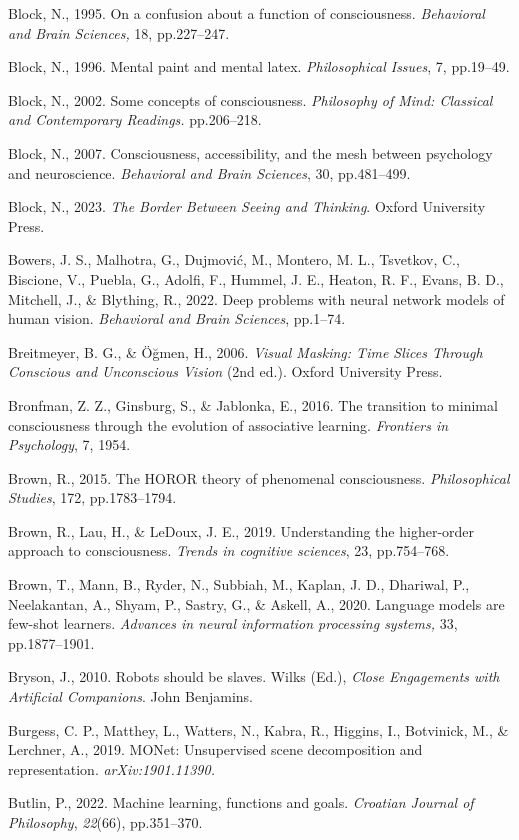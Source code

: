 \documentclass[12pt]{article}
\begin{document}
Block, N., 1995. On a confusion about a function of consciousness.
\emph{Behavioral and Brain Sciences,} 18, pp.227--247.

Block, N., 1996. Mental paint and mental latex. \emph{Philosophical
Issues}, 7, pp.19--49.

Block, N., 2002. Some concepts of consciousness. \emph{Philosophy of
Mind: Classical and Contemporary Readings.} pp.206--218.

Block, N., 2007. Consciousness, accessibility, and the mesh between
psychology and neuroscience. \emph{Behavioral and Brain Sciences}, 30,
pp.481--499.

Block, N., 2023. \emph{The Border Between Seeing and Thinking}. Oxford
University Press.

Bowers, J. S., Malhotra, G., Dujmović, M., Montero, M. L., Tsvetkov, C.,
Biscione, V., Puebla, G., Adolfi, F., Hummel, J. E., Heaton, R. F.,
Evans, B. D., Mitchell, J., \& Blything, R., 2022. Deep problems with
neural network models of human vision. \emph{Behavioral and Brain
Sciences}, pp.1--74.

Breitmeyer, B. G., \& Öğmen, H., 2006. \emph{Visual Masking: Time Slices
Through Conscious and Unconscious Vision} (2nd ed.). Oxford University
Press.

Bronfman, Z. Z., Ginsburg, S., \& Jablonka, E., 2016. The transition to
minimal consciousness through the evolution of associative learning.
\emph{Frontiers in Psychology}, 7, 1954.

Brown, R., 2015. The HOROR theory of phenomenal consciousness.
\emph{Philosophical Studies}, 172, pp.1783--1794.

Brown, R., Lau, H., \& LeDoux, J. E., 2019. Understanding the
higher-order approach to consciousness. \emph{Trends in cognitive
sciences}, 23, pp.754--768.

Brown, T., Mann, B., Ryder, N., Subbiah, M., Kaplan, J. D., Dhariwal,
P., Neelakantan, A., Shyam, P., Sastry, G., \& Askell, A., 2020.
Language models are few-shot learners. \emph{Advances in neural
information processing systems,} 33, pp.1877--1901.

Bryson, J., 2010. Robots should be slaves. Wilks (Ed.), \emph{Close
Engagements with Artificial Companions}. John Benjamins.

Burgess, C. P., Matthey, L., Watters, N., Kabra, R., Higgins, I.,
Botvinick, M., \& Lerchner, A., 2019. MONet: Unsupervised scene
decomposition and representation. \emph{arXiv:1901.11390.}

Butlin, P., 2022. Machine learning, functions and goals. \emph{Croatian
Journal of Philosophy}, \emph{22}(66), pp.351--370.
\end{document}
